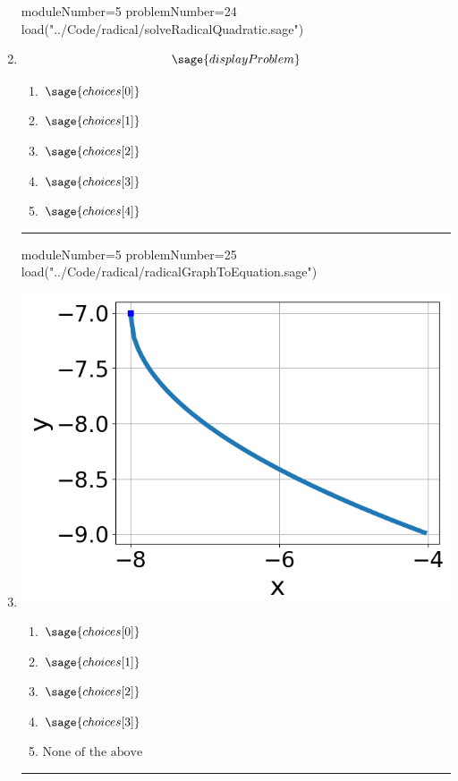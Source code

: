 \documentclass[14pt]{article}
\newcommand{\litem}[1]{\item#1\hspace*{-1cm}\rule{\textwidth}{0.4pt}}
\begin{document}
\begin{enumerate}
\begin{sagesilent}
moduleNumber=5
problemNumber=24
load("../Code/radical/solveRadicalQuadratic.sage")
\end{sagesilent}

\litem{

\[ \sage{displayProblem} \]

	\begin{enumerate}[label=\Alph*.]
		\item \( \sage{choices[0]} \)
		\item \( \sage{choices[1]} \)
		\item \( \sage{choices[2]} \)
		\item \( \sage{choices[3]} \)
		\item \( \sage{choices[4]} \)
	\end{enumerate}
}

\begin{sagesilent}
moduleNumber=5
problemNumber=25
load("../Code/radical/radicalGraphToEquation.sage")
\end{sagesilent}

\litem{
\begin{multicols}{2}
\begin{center}
\includegraphics[width=.3\textwidth]{../Figures/radicalGraphToEquationC.png}
\end{center}

\columnbreak

	\begin{enumerate}[label=\Alph*.]
		\item \( \sage{choices[0]} \)
		\item \( \sage{choices[1]} \)
		\item \( \sage{choices[2]} \)
		\item \( \sage{choices[3]} \)
    \item \( \text{None of the above} \)
	\end{enumerate}
\end{multicols}
}

\end{enumerate}
\end{document}

